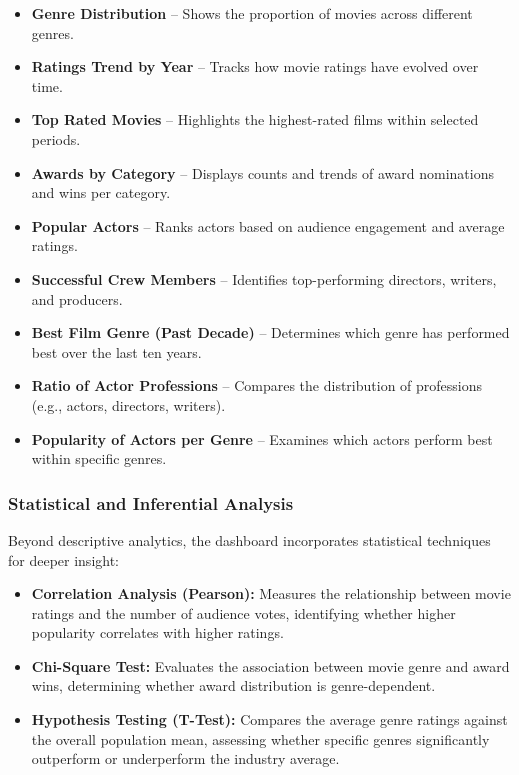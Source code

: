 \documentclass[sigconf, pbalance]{acmart}
\begin{document}
\begin{itemize}
    \item \textbf{Genre Distribution} – Shows the proportion of movies across different genres.
    \item \textbf{Ratings Trend by Year} – Tracks how movie ratings have evolved over time.
    \item \textbf{Top Rated Movies} – Highlights the highest-rated films within selected periods.
    \item \textbf{Awards by Category} – Displays counts and trends of award nominations and wins per category.
    \item \textbf{Popular Actors} – Ranks actors based on audience engagement and average ratings.
    \item \textbf{Successful Crew Members} – Identifies top-performing directors, writers, and producers.
    \item \textbf{Best Film Genre (Past Decade)} – Determines which genre has performed best over the last ten years.
    \item \textbf{Ratio of Actor Professions} – Compares the distribution of professions (e.g., actors, directors, writers).
    \item \textbf{Popularity of Actors per Genre} – Examines which actors perform best within specific genres.
\end{itemize}

\subsubsection{Statistical and Inferential Analysis}

Beyond descriptive analytics, the dashboard incorporates  statistical techniques for deeper insight:

\begin{itemize}
    \item \textbf{Correlation Analysis (Pearson):} Measures the relationship between movie ratings and the number of audience votes, identifying whether higher popularity correlates with higher ratings.
    \item \textbf{Chi-Square Test:} Evaluates the association between movie genre and award wins, determining whether award distribution is genre-dependent.
    \item \textbf{Hypothesis Testing (T-Test):} Compares the average genre ratings against the overall population mean, assessing whether specific genres significantly outperform or underperform the industry average.
\end{itemize}
\end{document}
